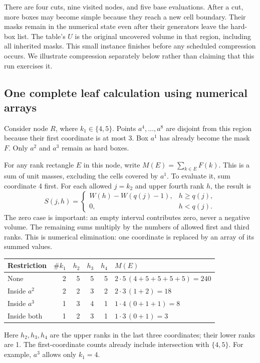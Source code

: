 There are four cuts, nine visited nodes, and five base evaluations.
After a cut, more boxes may become simple because they reach a new
cell boundary. Their masks remain in the numerical state even after
their generators leave the hard-box list. The table's $U$ is the
original uncovered volume in that region, including all inherited masks.
This small instance finishes before any scheduled compression occurs.
We illustrate compression separately below rather than claiming that
this run exercises it.

\clearpage
\subsection{One complete leaf calculation using numerical arrays}
Consider node $R$, where $k_1\in\{4,5\}$. Points $a^4,\ldots,a^8$
are disjoint from this region because their first coordinate is at most
3. Box $a^1$ has already become the mask $F$. Only $a^2$ and $a^3$
remain as hard boxes.

For any rank rectangle $E$ in this node, write
$M(E)=\sum_{k\in E}F(k)$. This is a sum of unit masses, excluding the
cells covered by $a^1$. To evaluate it, sum coordinate 4 first. For
each allowed $j=k_2$ and upper fourth rank $h$, the result is
\[
 S(j,h)=\begin{cases}W(h)-W(q(j)-1),&h\ge q(j),\\0,&h<q(j).
 \end{cases}
\]
The zero case is important: an empty interval contributes zero, never
a negative volume. The remaining sums multiply by the numbers of
allowed first and third ranks. This is numerical elimination: one
coordinate is replaced by an array of its summed values.

\begin{center}
\begin{tabular}{@{}lrrrrl@{}}
\toprule
Restriction&$\#k_1$&$h_2$&$h_3$&$h_4$&$M(E)$\\\midrule
None&2&5&5&5&$2\cdot5\,(4+5+5+5+5)=240$\\
Inside $a^2$&2&2&3&2&$2\cdot3\,(1+2)=18$\\
Inside $a^3$&1&3&4&1&$1\cdot4\,(0+1+1)=8$\\
Inside both&1&2&3&1&$1\cdot3\,(0+1)=3$\\\bottomrule
\end{tabular}
\end{center}
Here $h_2,h_3,h_4$ are the upper ranks in the last three coordinates;
their lower ranks are 1. The first-coordinate counts already include
intersection with $\{4,5\}$. For example, $a^3$ allows only $k_1=4$.

